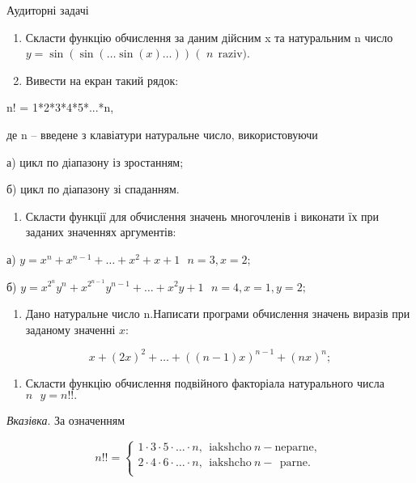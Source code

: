 \documentclass[]{article}
\begin{document}
Аудиторні задачі

\begin{enumerate}
\def\labelenumi{\arabic{enumi})}
\item
  Скласти функцію обчислення за даним дійсним x та натуральним n число
  \(y = \sin(\sin(\ldots\sin(x)\ldots))\) \((\)
  \(\mathrm{\ }n\mathrm{\ \ raziv}).\)
\item
  Вивести на екран такий рядок:
\end{enumerate}

n! = 1*2*3*4*5*...*n,

де n -- введене з клавіатури натуральне число, використовуючи

а) цикл по діапазону із зростанням;

б) цикл по діапазону зі спаданням.

\begin{enumerate}
\def\labelenumi{\arabic{enumi})}
\item
  Скласти функції для обчислення значень многочленів і виконати їх при
  заданих значеннях аргументів:
\end{enumerate}

а)
\(y = x^{n} + x^{n - 1} + \ldots + x^{2} + x + 1\mathrm{\text{\ \ \ \ \ \ \ \ \ \ \ \ \ \ \ \ \ \ \ \ }}n = 3,x = 2;\)

б)
\(y = x^{2^{n}}y^{n} + x^{2^{n - 1}}y^{n - 1} + \ldots + x^{2}y + 1\mathrm{\text{\ \ \ \ \ \ \ \ \ \ }}n = 4,x = 1,y = 2;\)

\begin{enumerate}
\def\labelenumi{\arabic{enumi})}
\item
  Дано натуральне число \(\text{n.}\)Написати програми обчислення
  значень виразів при заданому значенні \(x\):
\end{enumerate}

\[x + (2x)^{2} + \ldots + ((n - 1)x)^{n - 1} + (nx)^{n};\]

\begin{enumerate}
\def\labelenumi{\arabic{enumi})}
\item
  Скласти функцію обчислення подвійного факторіала натурального числа
  \(n\mathrm{\text{\ \ }}y = n!!.\)
\end{enumerate}

\emph{\emph{Вказівка}}. За означенням

\[n!! = \left\{ \begin{matrix}
1 \cdot 3 \cdot 5 \cdot \ldots \cdot n,\mathrm{\ \ iakshcho\ }n - \mathrm{neparne,} \\
2 \cdot 4 \cdot 6 \cdot \ldots \cdot n,\mathrm{\ \ iakshcho\ }n - \mathrm{\ \ parne.} \\
\end{matrix} \right.\ \]
\end{document}
